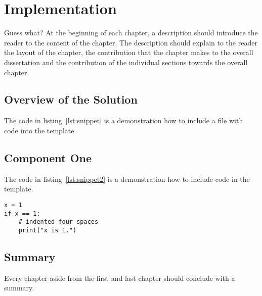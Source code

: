\chapter{Implementation}
\lstset{language=Python, captionpos=b, frame=single}
\captionsetup{width=.8\linewidth} 


Guess what? At the beginning of each chapter, a description should introduce the reader to the content of the chapter. The description should explain to the reader the layout of the chapter, the contribution that the chapter makes to the overall dissertation and the contribution of the individual sections towards the overall chapter.


\section{Overview of the Solution}


The code in listing~\ref{lst:snippet} is a demonstration how to include a file with code into the template.



\section{Component One}


The code in listing~\ref{lst:snippet2} is a demonstration how to include code in the template.

\begin{lstlisting}[caption={[Sample Code 2]Second Lengthy caption}, label={lst:snippet2}]
x = 1
if x == 1:
    # indented four spaces
    print("x is 1.")
\end{lstlisting}


\section{Summary}

Every chapter aside from the first and last chapter should conclude with a summary. 

